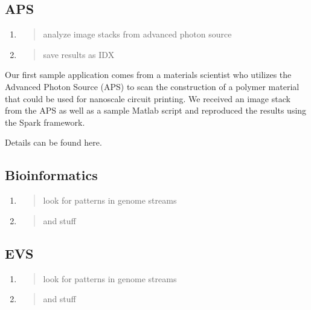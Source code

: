 \subsection{APS}\label{aps}

\begin{enumerate}
\def\labelenumi{\arabic{enumi}.}
\item
  \begin{quote}
  analyze image stacks from advanced photon source
  \end{quote}
\item
  \begin{quote}
  save results as IDX
  \end{quote}
\end{enumerate}

Our first sample application comes from a materials scientist who
utilizes the Advanced Photon Source (APS) to scan the construction of a
polymer material that could be used for nanoscale circuit printing. We
received an image stack from the APS as well as a sample Matlab script
and reproduced the results using the Spark framework.

Details can be found here.

\subsection{Bioinformatics}\label{bioinformatics}

\begin{enumerate}
\def\labelenumi{\arabic{enumi}.}
\item
  \begin{quote}
  look for patterns in genome streams
  \end{quote}
\item
  \begin{quote}
  and stuff
  \end{quote}
\end{enumerate}

\subsection{EVS}\label{evs}

\begin{enumerate}
\def\labelenumi{\arabic{enumi}.}
\item
  \begin{quote}
  look for patterns in genome streams
  \end{quote}
\item
  \begin{quote}
  and stuff
  \end{quote}
\end{enumerate}

